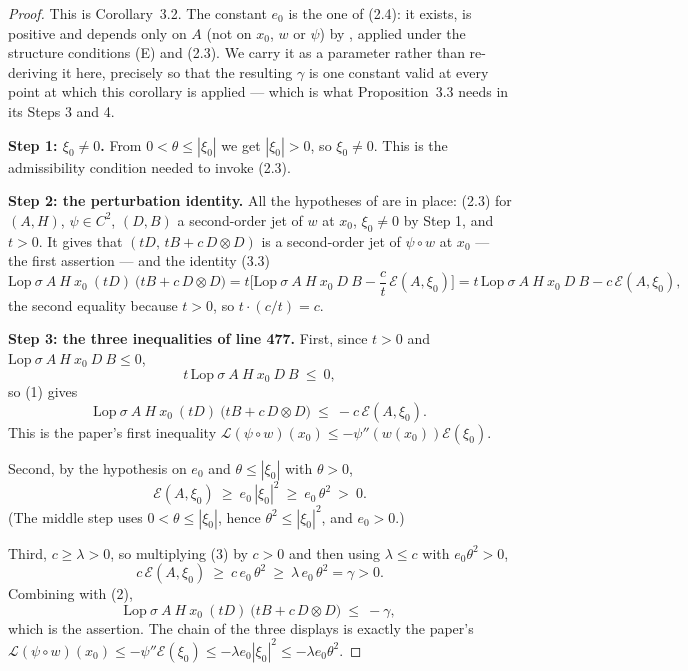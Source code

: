 \begin{proof}
This is Corollary~3.2. The constant $e_0$ is the one of (2.4): it exists, is positive and
depends only on $A$ (not on $x_0$, $w$ or $\psi$) by ,
applied under the structure conditions (E) and (2.3). We carry it as a parameter rather
than re-deriving it here, precisely so that the resulting $\gamma$ is one constant valid at
every point at which this corollary is applied --- which is what Proposition~3.3 needs in its
Steps 3 and 4.

\medskip\noindent\textbf{Step 1: $\xi_0\ne0$.} From $0<\theta\le|\xi_0|$ we get
$|\xi_0|>0$, so $\xi_0\ne0$. This is the admissibility condition needed to invoke
(2.3).

\medskip\noindent\textbf{Step 2: the perturbation identity.} All the hypotheses of
 are in place: (2.3) for $(A,H)$, $\psi\in C^{2}$,
$(D,B)$ a second-order jet of $w$ at $x_0$, $\xi_0\ne0$ by Step 1, and $t>0$. It gives
that $(tD,\,tB+c\,D\otimes D)$ is a second-order jet of $\psi\circ w$ at $x_0$ --- the
first assertion --- and the identity (3.3)
\[
 \mathrm{Lop}\ \sigma\ A\ H\ x_0\ (tD)\ \big(tB+c\,D\otimes D\big)
 =t\Big[\mathrm{Lop}\ \sigma\ A\ H\ x_0\ D\ B-\frac ct\,\mathcal E(A,\xi_0)\Big]
 =t\,\mathrm{Lop}\ \sigma\ A\ H\ x_0\ D\ B-c\,\mathcal E(A,\xi_0), \tag{1}
\]
the second equality because $t>0$, so $t\cdot(c/t)=c$.

\medskip\noindent\textbf{Step 3: the three inequalities of line 477.} First, since $t>0$
and $\mathrm{Lop}\ \sigma\ A\ H\ x_0\ D\ B\le0$,
\[
 t\,\mathrm{Lop}\ \sigma\ A\ H\ x_0\ D\ B\ \le\ 0 ,
\]
so (1) gives
\[
 \mathrm{Lop}\ \sigma\ A\ H\ x_0\ (tD)\ \big(tB+c\,D\otimes D\big)
 \ \le\ -c\,\mathcal E(A,\xi_0). \tag{2}
\]
This is the paper's first inequality $\mathcal L(\psi\circ w)(x_0)\le-\psi''(w(x_0))\mathcal E(\xi_0)$.

Second, by the hypothesis on $e_0$ and $\theta\le|\xi_0|$ with $\theta>0$,
\[
 \mathcal E(A,\xi_0)\ \ge\ e_0\,|\xi_0|^{2}\ \ge\ e_0\,\theta^{2}\ >\ 0 . \tag{3}
\]
(The middle step uses $0<\theta\le|\xi_0|$, hence $\theta^{2}\le|\xi_0|^{2}$, and
$e_0>0$.)

Third, $c\ge\lambda>0$, so multiplying (3) by $c>0$ and then using $\lambda\le c$ with
$e_0\theta^{2}>0$,
\[
 c\,\mathcal E(A,\xi_0)\ \ge\ c\,e_0\,\theta^{2}\ \ge\ \lambda\,e_0\,\theta^{2}=\gamma>0 .
\]
Combining with (2),
\[
 \mathrm{Lop}\ \sigma\ A\ H\ x_0\ (tD)\ \big(tB+c\,D\otimes D\big)\ \le\ -\gamma ,
\]
which is the assertion. The chain of the three displays is exactly the paper's
$\mathcal L(\psi\circ w)(x_0)\le-\psi''\mathcal E(\xi_0)\le-\lambda e_0|\xi_0|^{2}\le-\lambda e_0\theta^{2}$.


\end{proof}
